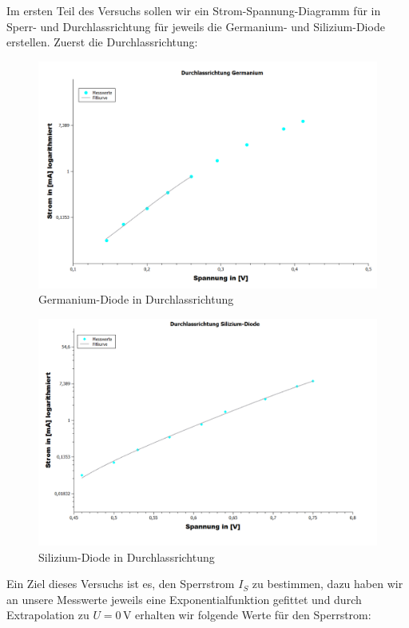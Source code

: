 \documentclass[fontsize=12pt]{scrartcl}
\begin{document}
Im ersten Teil des Versuchs sollen wir ein Strom-Spannung-Diagramm für in Sperr- und Durchlassrichtung für jeweils die Germanium- und Silizium-Diode erstellen. Zuerst die Durchlassrichtung:\\
\begin{figure}[H]
\vspace{-20pt}
\centering
\includegraphics[scale=0.35]{Graphik/Germanium_Durchlass}
\caption{Germanium-Diode in Durchlassrichtung}
\end{figure}
\noindent
\begin{figure}[H]
\vspace{-20pt}
\centering
\includegraphics[scale=0.35]{Graphik/Silizium_Durchlass}
\caption{Silizium-Diode in Durchlassrichtung}
\end{figure}
\newpage
\noindent
Ein Ziel dieses Versuchs ist es, den Sperrstrom $I_S$ zu bestimmen, dazu haben wir an unsere Messwerte jeweils eine Exponentialfunktion gefittet und durch Extrapolation zu $U=0$\,V erhalten wir folgende Werte für den Sperrstrom:
\end{document}
